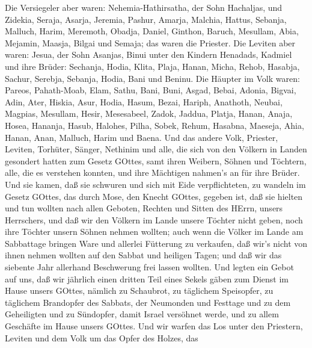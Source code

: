  Die Versiegeler aber waren: Nehemia-Hathirsatha, der Sohn
Hachaljas, und Zidekia,  Seraja, Asarja, Jeremia,
 Pashur, Amarja, Malchia,  Hattus, Sebanja,
Malluch,  Harim, Meremoth, Obadja,  Daniel,
Ginthon, Baruch,  Mesullam, Abia, Mejamin, 
Maasja, Bilgai und Semaja; das waren die Priester.  Die
Leviten aber waren: Jesua, der Sohn Asanjas, Binui unter den Kindern
Henadads, Kadmiel  und ihre Brüder: Sechanja, Hodia, Klita,
Plaja, Hanan,  Micha, Rehob, Hasabja,  Sachur,
Serebja, Sebanja,  Hodia, Bani und Beninu. 
Die Häupter im Volk waren: Pareos, Pahath-Moab, Elam, Sathu, Bani,
 Buni, Asgad, Bebai,  Adonia, Bigvai, Adin,
 Ater, Hiskia, Asur,  Hodia, Hasum, Bezai,
 Hariph, Anathoth, Neubai,  Magpias, Mesullam,
Hesir,  Mesesabeel, Zadok, Jaddua,  Platja,
Hanan, Anaja,  Hosea, Hananja, Hasub, 
Halohes, Pilha, Sobek,  Rehum, Hasabna, Maeseja,
 Ahia, Hanan, Anan,  Malluch, Harim und Baena.
 Und das andere Volk, Priester, Leviten, Torhüter, Sänger,
Nethinim und alle, die sich von den Völkern in Landen gesondert hatten
zum Gesetz GOttes, samt ihren Weibern, Söhnen und Töchtern, alle, die es
verstehen konnten,  und ihre Mächtigen nahmen's an für ihre
Brüder. Und sie kamen, daß sie schwuren und sich mit Eide
verpflichteten, zu wandeln im Gesetz GOttes, das durch Mose, den Knecht
GOttes, gegeben ist, daß sie hielten und tun wollten nach allen Geboten,
Rechten und Sitten des HErrn, unsers Herrschers,  und daß
wir den Völkern im Lande unsere Töchter nicht geben, noch ihre Töchter
unsern Söhnen nehmen wollten;  auch wenn die Völker im
Lande am Sabbattage bringen Ware und allerlei Fütterung zu verkaufen,
daß wir's nicht von ihnen nehmen wollten auf den Sabbat und heiligen
Tagen; und daß wir das siebente Jahr allerhand Beschwerung frei lassen
wollten.  Und legten ein Gebot auf uns, daß wir jährlich
einen dritten Teil eines Sekels gäben zum Dienst im Hause unsers GOttes,
 nämlich zu Schaubrot, zu täglichem Speisopfer, zu
täglichem Brandopfer des Sabbats, der Neumonden und Festtage und zu dem
Geheiligten und zu Sündopfer, damit Israel versöhnet werde, und zu allem
Geschäfte im Hause unsers GOttes.  Und wir warfen das Los
unter den Priestern, Leviten und dem Volk um das Opfer des Holzes, das
